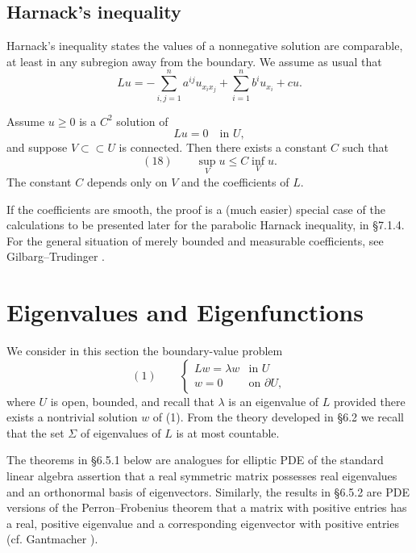 \subsection{Harnack's inequality}

Harnack's inequality states the values of a nonnegative solution are comparable, at least in any subregion away from the boundary. We assume as usual that
$$Lu = -\sum_{i,j=1}^n a^{ij}u_{x_ix_j} + \sum_{i=1}^n b^iu_{x_i} + cu.$$

\begin{theorem}
\label{thm:harnacks-inequality-elliptic}
Assume $u \geq 0$ is a $C^2$ solution of
$$Lu = 0 \quad \text{in } U,$$
and suppose $V \subset\subset U$ is connected. Then there exists a constant $C$ such that
$$(18) \qquad \sup_V u \leq C\inf_V u.$$
The constant $C$ depends only on $V$ and the coefficients of $L$.
\end{theorem}

If the coefficients are smooth, the proof is a (much easier) special case of the calculations to be presented later for the parabolic Harnack inequality, in \S7.1.4. For the general situation of merely bounded and measurable coefficients, see Gilbarg--Trudinger \cite{GilbargTrudinger1983}.

\section{Eigenvalues and Eigenfunctions}
\label{sec:elliptic-eigenvalues}

We consider in this section the boundary-value problem
$$(1) \qquad \begin{cases} Lw = \lambda w & \text{in } U \\ w = 0 & \text{on } \partial U, \end{cases}$$
where $U$ is open, bounded, and recall that $\lambda$ is an eigenvalue of $L$ provided there exists a nontrivial solution $w$ of (1). From the theory developed in \S6.2 we recall that the set $\Sigma$ of eigenvalues of $L$ is at most countable.

The theorems in \S6.5.1 below are analogues for elliptic PDE of the standard linear algebra assertion that a real symmetric matrix possesses real eigenvalues and an orthonormal basis of eigenvectors. Similarly, the results in \S6.5.2 are PDE versions of the Perron--Frobenius theorem that a matrix with positive entries has a real, positive eigenvalue and a corresponding eigenvector with positive entries (cf. Gantmacher \cite{Gantmacher1977}).

